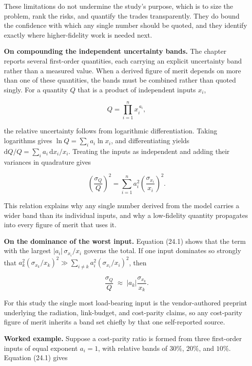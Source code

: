 \documentclass[
  11pt,
  openany,
  oneside]{book}
\begin{document}
These limitations do not undermine the study's purpose, which is to size
the problem, rank the risks, and quantify the trades transparently. They
do bound the confidence with which any single number should be quoted,
and they identify exactly where higher-fidelity work is needed next.

\textbf{On compounding the independent uncertainty bands.} The chapter
reports several first-order quantities, each carrying an explicit
uncertainty band rather than a measured value. When a derived figure of
merit depends on more than one of these quantities, the bands must be
combined rather than quoted singly. For a quantity \(Q\) that is a
product of independent inputs \(x_i\),

\[ Q = \prod_{i=1}^{n} x_i^{\,a_i}, \]

the relative uncertainty follows from logarithmic differentiation.
Taking logarithms gives \(\ln Q = \sum_i a_i \ln x_i\), and
differentiating yields
\(\mathrm{d}Q/Q = \sum_i a_i\,\mathrm{d}x_i/x_i\). Treating the inputs
as independent and adding their variances in quadrature gives

\begin{equation}
\left(\frac{\sigma_Q}{Q}\right)^{2} = \sum_{i=1}^{n} a_i^{2}\left(\frac{\sigma_{x_i}}{x_i}\right)^{2}. \tag{24.1}
\end{equation}

This relation explains why any single number derived from the model
carries a wider band than its individual inputs, and why a low-fidelity
quantity propagates into every figure of merit that uses it.

\textbf{On the dominance of the worst input.} Equation (24.1) shows that
the term with the largest \(|a_i|\,\sigma_{x_i}/x_i\) governs the total.
If one input dominates so strongly that
\(a_k^2(\sigma_{x_k}/x_k)^2 \gg \sum_{i\neq k} a_i^2(\sigma_{x_i}/x_i)^2\),
then

\begin{equation}
\frac{\sigma_Q}{Q} \;\approx\; \left|a_k\right|\frac{\sigma_{x_k}}{x_k}. \tag{24.2}
\end{equation}

For this study the single most load-bearing input is the vendor-authored
preprint underlying the radiation, link-budget, and cost-parity claims,
so any cost-parity figure of merit inherits a band set chiefly by that
one self-reported source.

\textbf{Worked example.} Suppose a cost-parity ratio is formed from
three first-order inputs of equal exponent \(a_i = 1\), with relative
bands of \(30\%\), \(20\%\), and \(10\%\). Equation (24.1) gives
\end{document}
